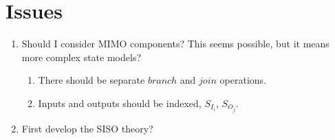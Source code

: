 \documentclass[unnumsec,webpdf,contemporary,large]{oup-authoring-template}%
\theoremstyle{thmstyleone}%
\theoremstyle{thmstyletwo}%
\theoremstyle{thmstylethree}%
\begin{document}
\section{Issues}
\begin{enumerate}
    \item Should I consider MIMO components? This seems possible, but it means more complex state models?
    \begin{enumerate}
    \item There should be separate $branch$ and $join$ operations.
    \item Inputs and outputs should be indexed, $S_{I_i}$, $S_{O_j}$.
    \end{enumerate}
    \item First develop the SISO theory?
\end{enumerate}



\end{document}
